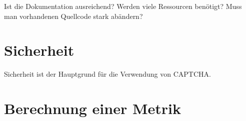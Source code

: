 Ist die Dokumentation ausreichend? Werden viele Ressourcen benötigt? Muss man vorhandenen Quellcode stark abändern?

\section{Sicherheit}
Sicherheit ist der Hauptgrund für die Verwendung von CAPTCHA. 


\section{Berechnung einer Metrik}

